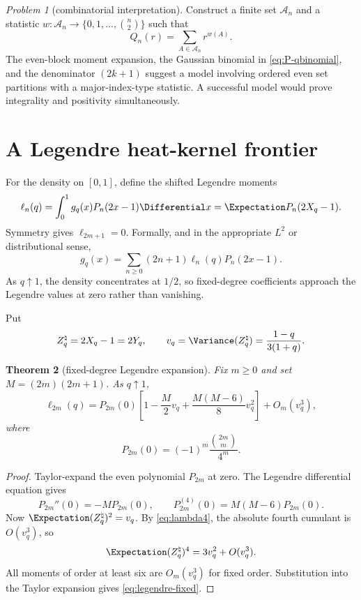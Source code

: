 \documentclass[11pt,oneside]{article}
\newtheorem{theorem}{Theorem}[section]
\theoremstyle{definition}
\theoremstyle{remark}
\newtheorem{problem}[theorem]{Problem}
\begin{document}
\begin{problem}[combinatorial interpretation]\label{prob:moment-combinatorics}
Construct a finite set $\mathcal A_n$ and a statistic $w:\mathcal A_n\to\{0,1,\ldots,\binom n2\}$ such that
\[
 Q_n(r)=\sum_{A\in\mathcal A_n}r^{w(A)}.
\]
The even-block moment expansion, the Gaussian binomial in \cref{eq:P-qbinomial}, and the denominator $(2k+1)$ suggest a model involving ordered even set partitions with a major-index-type statistic.  A successful model would prove integrality and positivity simultaneously.
\end{problem}

\section{A Legendre heat-kernel frontier}
\label{sec:legendre}

For the density on $[0,1]$, define the shifted Legendre moments
\begin{equation}\label{eq:legendre-moment}
 \ell_n(q)=\int_0^1g_q(x)P_n(2x-1)\Differential x
 =\Expectation P_n(2X_q-1).
\end{equation}
Symmetry gives $\ell_{2m+1}=0$.  Formally, and in the appropriate $L^2$ or distributional sense,
\begin{equation}\label{eq:legendre-expansion}
 g_q(x)=\sum_{n\ge0}(2n+1)\ell_n(q)P_n(2x-1).
\end{equation}
As $q\uparrow1$, the density concentrates at $1/2$, so fixed-degree coefficients approach the Legendre values at zero rather than vanishing.

Put
\begin{equation}\label{eq:vq}
 Z_q^{\natural}=2X_q-1=2Y_q,
 \qquad
 v_q=\Variance(Z_q^{\natural})=\frac{1-q}{3(1+q)}.
\end{equation}

\begin{theorem}[fixed-degree Legendre expansion]\label{thm:legendre-fixed}
Fix $m\ge0$ and set $M=(2m)(2m+1)$.  As $q\uparrow1$,
\begin{equation}\label{eq:legendre-fixed}
 \ell_{2m}(q)=P_{2m}(0)
 \left[1-\frac{M}{2}v_q+\frac{M(M-6)}8v_q^2\right]
 +O_m(v_q^3),
\end{equation}
where
\begin{equation}\label{eq:P-even-zero}
 P_{2m}(0)=(-1)^m\frac{\binom{2m}{m}}{4^m}.
\end{equation}
\end{theorem}

\begin{proof}
Taylor-expand the even polynomial $P_{2m}$ at zero.  The Legendre differential equation gives
\[
 P_{2m}''(0)=-MP_{2m}(0),
 \qquad
 P_{2m}^{(4)}(0)=M(M-6)P_{2m}(0).
\]
Now $\Expectation(Z_q^{\natural})^2=v_q$.  By \cref{eq:lambda4}, the absolute fourth cumulant is $O(v_q^3)$, so
\[
 \Expectation(Z_q^{\natural})^4=3v_q^2+O(v_q^3).
\]
All moments of order at least six are $O_m(v_q^3)$ for fixed order.  Substitution into the Taylor expansion gives \cref{eq:legendre-fixed}.
\end{proof}
\end{document}
